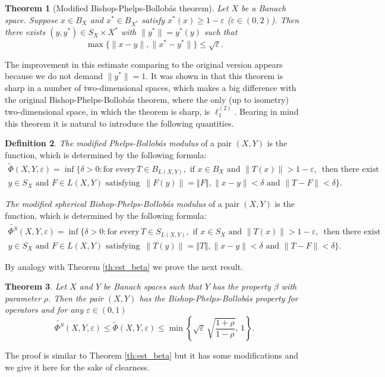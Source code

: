 \documentclass[11pt,a4paper]{amsart}
\newcommand{\eps}{\varepsilon}
\newcommand{\norm}[1]{\left\Vert#1\right\Vert}
\numberwithin{equation}{section}
\theoremstyle{plain}
\newtheorem{theorem}{Theorem}[section]
\theoremstyle{definition}
\newtheorem{definition}[theorem]{Definition}
\renewcommand{\leq}{\leqslant}
\renewcommand{\geq}{\geqslant}
\begin{document}
\begin{theorem}[Modified Bishop-Phelps-Bollob\'{a}s theorem]\label{Modifth:BPB}
Let $X$ be a Banach space. Suppose $x\in B_X$ and $x^*\in B_{X^*}$
satisfy $ x^*(x) \geq 1 -  \eps$ ($\eps \in (0, 2)$). Then there exists $(y,y^*)\in S_X\times X^*$ with $\|y^*\|=y^*(y)$ such that
\begin{equation*} 
 \max\{\|x-y\|, \|x^*-y^*\|\} \leq\sqrt{\eps}.
 \end{equation*}
\end{theorem}
The improvement in this estimate comparing to the original version appears because we do not demand
$\|y^*\|=1$.  It was shown in \cite{KadS} that this theorem is sharp in a number of two-dimensional spaces, which makes a big difference with the original  Bishop-Phelps-Bollob\'{a}s theorem, where the only (up to isometry) two-dimensional space, in which the theorem is sharp, is $\ell_1^{(2)}$. Bearing in mind this theorem it is natural to introduce the following quantities.
\begin{definition}
 \textit{The  modified Phelps-Bollob\'as modulus} of a pair $(X, Y)$ is the function, which is determined by the following formula:
\begin{align*}
\widetilde{\Phi}(X,Y,\varepsilon)= \inf \lbrace \delta>0: \text{for every} \, T\in B_{L(X,Y)} ,  \mbox{ if } x\in B_X \mbox{ and } \|T(x)\|> 1-\eps, \, \mbox{ then there exist} \\
y\in S_X \mbox{ and } F\in L(X,Y)  \mbox{ satisfying }       
\, { \|F(y)\|=\norm{F}}, \|x-y\|<\delta \text{ and } \|T-F\|< \delta \rbrace.
\end{align*}

\textit{The modified spherical Bishop-Phelps-Bollob\'as modulus} of a pair $(X, Y)$ is the function, which is determined by the following formula:
\begin{align*}
\widetilde{\Phi^S}(X,Y,\varepsilon)= \inf \lbrace \delta>0: \text{for every} \, T\in S_{L(X,Y)} ,  \mbox{ if } x\in S_X \mbox{ and } \|T(x)\|> 1-\eps, \, \mbox{ then there exist} \\
y\in S_X \mbox{ and } F\in L(X,Y)  \mbox{ satisfying }       
\, \|T(y)\|=\norm{T}, \|x-y\|<\delta \text{ and } \|T-F\|< \delta\rbrace.
\end{align*}

\end{definition}


By analogy with Theorem \ref{th:est_beta} we prove the next result. 

\begin{theorem}\label{modif_th:est_beta}
Let $X$ and $Y$ be Banach spaces such that $Y$ has the property $\beta$ with parameter $\rho$. Then the pair $(X,Y)$ has the Bishop-Phelps-Bollob\'as property for operators and for any $\varepsilon\in(0, 1)$
\begin{equation} \label{equat:modif_th:est_beta}
\widetilde{\Phi^S}(X,Y,\varepsilon)\leq\widetilde{\Phi}(X,Y,\varepsilon)\leq \min \left\lbrace\sqrt{\eps}\,\sqrt{\frac{1+\rho}{1-\rho}}, \,1\right\rbrace .
\end{equation}
\end{theorem}
The proof is similar to Theorem \ref{th:est_beta} but it has some modifications and we give it here for the sake of clearness.
\end{document}
